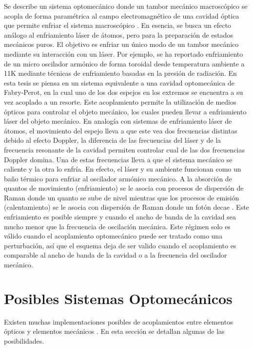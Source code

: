 \documentclass[a4paper,10pt]{report}
\begin{document}
Se describe un sistema optomecánico donde un tambor mecánico macroscópico se acopla de forma paramétrica al campo electromagnético de una cavidad óptica que permite enfriar el sistema macroscópico \cite{NooshiLC}. En esencia, se busca un efecto análogo al enfriamiento láser de átomos, pero para la preparación de estados mecánicos puros. El objetivo es enfriar un único modo de un tambor mecánico mediante su interacción con un láser. Por ejemplo, se ha reportado enfriamiento de un micro oscilador armónico de forma toroidal desde temperatura ambiente a 11K mediante técnicas de enfriamiento basadas en la presión de radiación\cite{SchliesserRPC}. En esta tesis se piensa en un sistema equivalente a una cavidad optomecánica de Fabry-Perot, en la cual uno de los dos espejos en los extremos se encuentra a su vez acoplado a un resorte. Este acoplamiento permite la utilización de medios ópticos para controlar el objeto mecánico, los cuales pueden llevar a enfriamiento láser del objeto mecánico\cite{NooshiLC}. En analogía con sistemas de enfriamiento láser de átomos, el movimiento del espejo lleva a que este vea dos frecuencias distintas debido al efecto Doppler\cite{KippenberCO}, la diferencia de las frecuencias del láser y de la frecuencia resonante de la cavidad permiten controlar cual de las dos frecuencias Doppler domina. Una de estas frecuencias lleva a que el sistema mecánico se caliente y la otra lo enfría. En efecto, el láser y su ambiente funcionan como un baño térmico para enfriar al oscilador armónico mecánico. A la absorción de quantos de movimiento (enfriamiento) se le asocia con procesos de dispersión de Raman donde un quanto se sube de nivel mientras que los procesos de emisión (calentamiento) se le asocia con dispersión de Raman donde un fotón decae \cite{LCNooshi}. Este enfriamiento es posible siempre y cuando el ancho de banda de la cavidad sea mucho menor que la frecuencia de oscilación mecánica. \cite{LCNooshi} \cite{MarquardtSC} Este régimen solo es válido cuando el acoplamiento optomecánico puede ser tratado como una perturbación, así que el esquema deja de ser valido cuando el acoplamiento es comparable al ancho de banda de la cavidad o a la frecuencia del oscilador mecánico.

\section{Posibles Sistemas Optomecánicos}

Existen muchas implementaciones posibles de acoplamientos entre elementos ópticos y elementos mecánicos \cite{KippenberCO}. En esta sección se detallan algunas de las posibilidades.
\end{document}

